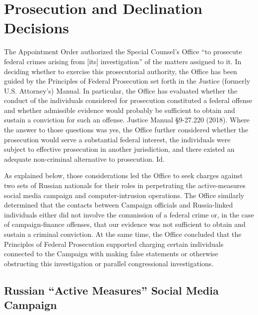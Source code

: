 \section{Prosecution and Declination Decisions}
The Appointment Order authorized the Special Counsel's Office ``to prosecute federal crimes arising from [its] investigation'' of the matters assigned to it.
In deciding whether to exercise this prosecutorial authority, the Office has been guided by the Principles of Federal Prosecution set forth in the Justice (formerly U.S. Attorney's) Manual.
In particular, the Office has evaluated whether the conduct of the individuals considered for prosecution constituted a federal offense and whether admissible evidence would probably be sufficient to obtain and sustain a conviction for such an offense.
Justice Manual \S 9-27.220 (2018).
Where the answer to those questions was yes, the Office further considered whether the prosecution would serve a substantial federal interest, the individuals were subject to effective prosecution in another jurisdiction, and there existed an adequate non-criminal alternative to prosecution.
Id.

As explained below, those considerations led the Office to seek charges against two sets of Russian nationals for their roles in perpetrating the active-measures social media campaign and computer-intrusion operations.
The Office similarly determined that the contacts between Campaign officials and Russia-linked individuals either did not involve the commission of a federal crime or, in the case of campaign-finance offenses, that our evidence was not sufficient to obtain and sustain a criminal conviction.
At the same time, the Office concluded that the Principles of Federal Prosecution supported charging certain individuals connected to the Campaign with making false statements or otherwise obstructing this investigation or parallel congressional investigations.

\subsection{Russian ``Active Measures'' Social Media Campaign}

